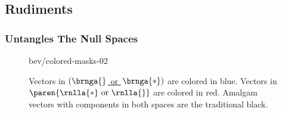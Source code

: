 % 


	

%

\subsection{Rudiments}

%	

\begin{frame}\frametitle{\lsq Untangles The Null Spaces}
\begin{figure}[t]
\centering
	\begin{overpic}[ scale = 0.75 ]{\pLocalGraphics bev/colored-masks-02}
	\end{overpic}
\label{fig:Seeing the subspace decomposition}
\caption{Vectors in \href{https://mathworld.wolfram.com/ColumnSpace.html}{ $\left( \brnga{} \right.$ or $\left. \brnga{*}\right)$} are colored in blue. Vectors in \href{https://mathworld.wolfram.com/NullSpace.html}{ $\paren{\rnlla{*} \text{ or } \rnlla{}}$} are colored in red. Amalgam vectors with components in both spaces are the traditional black.}
\end{figure}
\end{frame}

	
		
	


\endinput  %
